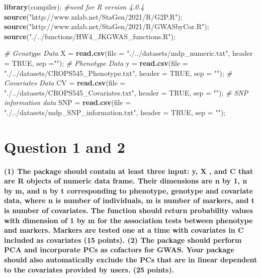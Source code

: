 \documentclass[
]{article}
\newenvironment{Shaded}{\begin{snugshade}}{\end{snugshade}}
\newcommand{\CommentTok}[1]{\textcolor[rgb]{0.56,0.35,0.01}{\textit{#1}}}
\newcommand{\DataTypeTok}[1]{\textcolor[rgb]{0.13,0.29,0.53}{#1}}
\newcommand{\KeywordTok}[1]{\textcolor[rgb]{0.13,0.29,0.53}{\textbf{#1}}}
\newcommand{\NormalTok}[1]{#1}
\newcommand{\OtherTok}[1]{\textcolor[rgb]{0.56,0.35,0.01}{#1}}
\newcommand{\StringTok}[1]{\textcolor[rgb]{0.31,0.60,0.02}{#1}}
\begin{document}
\begin{Shaded}
\begin{Highlighting}[]
\KeywordTok{library}\NormalTok{(compiler); }\CommentTok{\#need for R version 4.0.4}
\KeywordTok{source}\NormalTok{(}\StringTok{"http://www.zzlab.net/StaGen/2021/R/G2P.R"}\NormalTok{);}
\KeywordTok{source}\NormalTok{(}\StringTok{"http://www.zzlab.net/StaGen/2021/R/GWASbyCor.R"}\NormalTok{);}
\KeywordTok{source}\NormalTok{(}\StringTok{"./../functions/HW4\_JKGWAS\_functions.R"}\NormalTok{);}

\CommentTok{\# Genotype Data}
\NormalTok{X =}\StringTok{ }\KeywordTok{read.csv}\NormalTok{(}\DataTypeTok{file =} \StringTok{"./../datasets/mdp\_numeric.txt"}\NormalTok{, }\DataTypeTok{header =} \OtherTok{TRUE}\NormalTok{, }\DataTypeTok{sep =}\StringTok{""}\NormalTok{);}
\CommentTok{\# Phenotype Data}
\NormalTok{y =}\StringTok{ }\KeywordTok{read.csv}\NormalTok{(}\DataTypeTok{file =} \StringTok{"./../datasets/CROPS545\_Phenotype.txt"}\NormalTok{, }\DataTypeTok{header =} \OtherTok{TRUE}\NormalTok{, }\DataTypeTok{sep =} \StringTok{""}\NormalTok{);}
\CommentTok{\# Covariates Data}
\NormalTok{CV =}\StringTok{ }\KeywordTok{read.csv}\NormalTok{(}\DataTypeTok{file =} \StringTok{"./../datasets/CROPS545\_Covariates.txt"}\NormalTok{, }\DataTypeTok{header =} \OtherTok{TRUE}\NormalTok{, }\DataTypeTok{sep =} \StringTok{""}\NormalTok{);}
\CommentTok{\# SNP information data}
\NormalTok{SNP =}\StringTok{ }\KeywordTok{read.csv}\NormalTok{(}\DataTypeTok{file =} \StringTok{"./../datasets/mdp\_SNP\_information.txt"}\NormalTok{, }\DataTypeTok{header =} \OtherTok{TRUE}\NormalTok{, }\DataTypeTok{sep =} \StringTok{""}\NormalTok{);}
\end{Highlighting}
\end{Shaded}

\hypertarget{question-1-and-2}{%
\section{Question 1 and 2}\label{question-1-and-2}}

\textbf{(1) The package should contain at least three input: y, X , and C that are R objects of numeric data frame. Their dimensions are n by 1, n by m, and n by t corresponding to phenotype, genotype and covariate data, where n is number of individuals, m is number of markers, and t is number of covariates. The function should return probability values with dimension of 1 by m for the association tests between phenotype and markers. Markers are tested one at a time with covariates in C included as covariates (15 points).
(2) The package should perform PCA and incorporate PCs as cofactors for GWAS.  Your package should also automatically exclude the PCs that are in linear dependent to the covariates provided by users. (25 points).}
\end{document}
